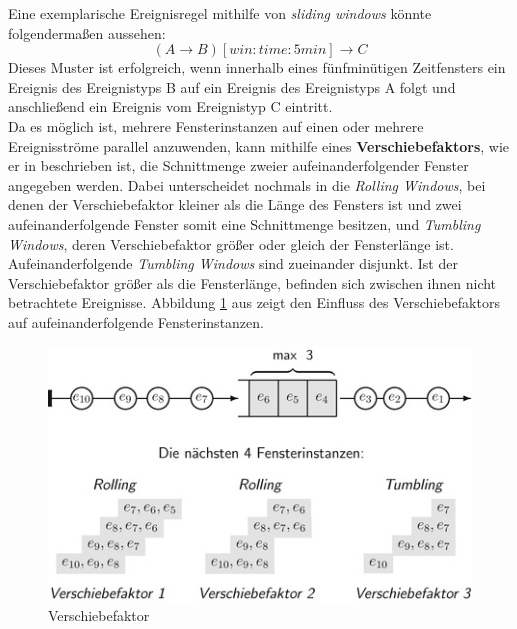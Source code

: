 \documentclass{acm_proc_article-sp}
\begin{document}
Eine exemplarische Ereignisregel mithilfe von \textit{sliding windows} könnte 
folgendermaßen 
aussehen:
$$(A \rightarrow B)[win:time:5min] \rightarrow C$$
Dieses Muster ist erfolgreich, wenn innerhalb eines fünfminütigen Zeitfensters ein 
Ereignis des Ereignistyps B auf ein Ereignis des Ereignistyps A folgt und anschließend 
ein Ereignis vom Ereignistyp C eintritt.\\
Da es möglich ist, mehrere Fensterinstanzen auf einen oder mehrere Ereignisströme 
parallel 
anzuwenden, kann mithilfe eines \textbf{Verschiebefaktors}\label{kap:verschiebefaktor}, 
wie er in \cite{hedtstuck} beschrieben 
ist, die Schnittmenge zweier aufeinanderfolgender Fenster angegeben werden. Dabei 
unterscheidet \cite{hedtstuck} nochmals in die \textit{Rolling Windows}, bei denen der 
Verschiebefaktor kleiner als die Länge des Fensters ist und zwei aufeinanderfolgende 
Fenster somit eine Schnittmenge besitzen, und \textit{Tumbling Windows}, deren 
Verschiebefaktor größer oder gleich der Fensterlänge ist. Aufeinanderfolgende 
\textit{Tumbling Windows} sind zueinander disjunkt. Ist der Verschiebefaktor größer 
als die Fensterlänge, befinden sich zwischen ihnen nicht betrachtete Ereignisse. 
Abbildung \ref{img:factors} aus \cite{hedtstuck} zeigt den Einfluss des 
Verschiebefaktors auf aufeinanderfolgende Fensterinstanzen.

\begin{figure}[H]
    \centering
    \includegraphics[width=\linewidth]{img/factor-hedstuck}
    \caption{Verschiebefaktor}
    \label{img:factors}
\end{figure}
\end{document}
